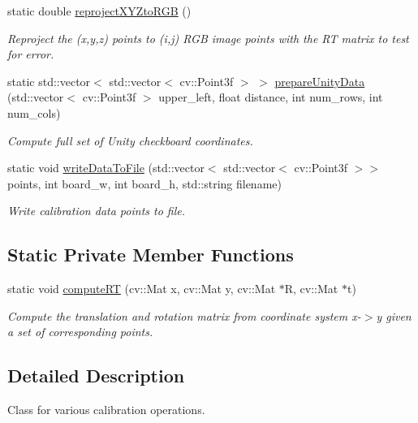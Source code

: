 \begin{DoxyCompactItemize}
static double \hyperlink{class_calibration_a05a3ca33bf7fb56ddf0c683be667660a}{reproject\+X\+Y\+Zto\+R\+GB} ()
\begin{DoxyCompactList}\small\item\em Reproject the (x,y,z) points to (i,j) R\+GB image points with the RT matrix to test for error. \end{DoxyCompactList}\item 
static std\+::vector$<$ std\+::vector$<$ cv\+::\+Point3f $>$ $>$ \hyperlink{class_calibration_af202af5f65e2f7242d29f09760f668d9}{prepare\+Unity\+Data} (std\+::vector$<$ cv\+::\+Point3f $>$ upper\+\_\+left, float distance, int num\+\_\+rows, int num\+\_\+cols)
\begin{DoxyCompactList}\small\item\em Compute full set of Unity checkboard coordinates. \end{DoxyCompactList}\item 
static void \hyperlink{class_calibration_acd3adc799a4a9ce12ce1547e989e20a4}{write\+Data\+To\+File} (std\+::vector$<$ std\+::vector$<$ cv\+::\+Point3f $>$$>$ points, int board\+\_\+w, int board\+\_\+h, std\+::string filename)
\begin{DoxyCompactList}\small\item\em Write calibration data points to file. \end{DoxyCompactList}\end{DoxyCompactItemize}
\subsection*{Static Private Member Functions}
\begin{DoxyCompactItemize}
\item 
static void \hyperlink{class_calibration_af69876a9c99d1ba8b87054796cf6be3e}{compute\+RT} (cv\+::\+Mat x, cv\+::\+Mat y, cv\+::\+Mat $\ast$R, cv\+::\+Mat $\ast$t)
\begin{DoxyCompactList}\small\item\em Compute the translation and rotation matrix from coordinate system x-\/$>$y given a set of corresponding points. \end{DoxyCompactList}\end{DoxyCompactItemize}


\subsection{Detailed Description}
Class for various calibration operations. 

